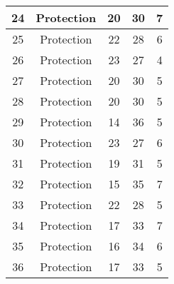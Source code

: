 \documentclass[results.tex]{subfiles}
\begin{document}
\begin{center}
\begin{tabular}{| c || c | c | c | c |}
            \hline
            24                      & Protection                   & 20                     & 30                      & 7                    \\
            \hline
            25                      & Protection                   & 22                     & 28                      & 6                    \\
            \hline
            26                      & Protection                   & 23                     & 27                      & 4                    \\
            \hline
            27                      & Protection                   & 20                     & 30                      & 5                    \\
            \hline
            28                      & Protection                   & 20                     & 30                      & 5                    \\
            \hline
            29                      & Protection                   & 14                     & 36                      & 5                    \\
            \hline
            30                      & Protection                   & 23                     & 27                      & 6                    \\
            \hline
            31                      & Protection                   & 19                     & 31                      & 5                    \\
            \hline
            32                      & Protection                   & 15                     & 35                      & 7                    \\
            \hline
            33                      & Protection                   & 22                     & 28                      & 5                    \\
            \hline
            34                      & Protection                   & 17                     & 33                      & 7                    \\
            \hline
            35                      & Protection                   & 16                     & 34                      & 6                    \\
            \hline
            36                      & Protection                   & 17                     & 33                      & 5                    \\

\end{tabular}
\end{center}
\end{document}
